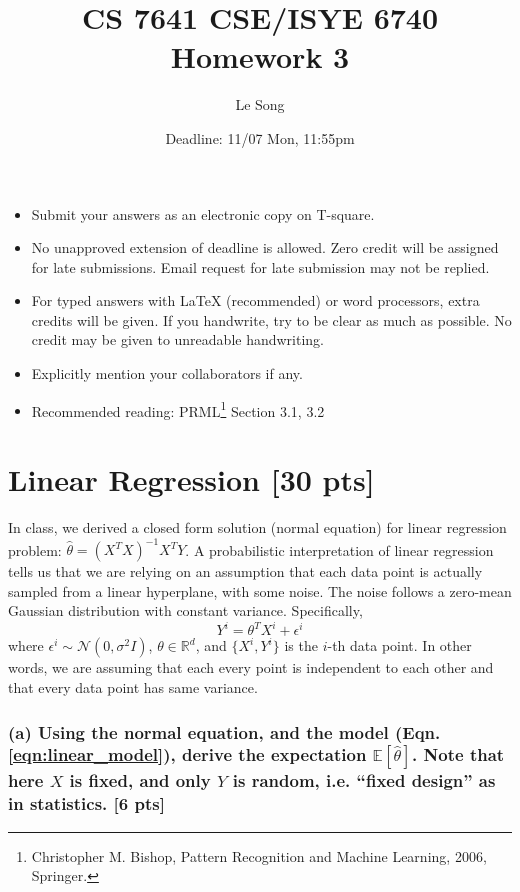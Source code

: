 \documentclass[twoside,10pt]{article}
\begin{document}
\title{CS 7641 CSE/ISYE 6740 Homework 3}
\author{Le Song}
\date{Deadline: 11/07 Mon, 11:55pm}
\maketitle

\begin{itemize}
  \item Submit your answers as an electronic copy on T-square.
  \item No unapproved extension of deadline is allowed. Zero credit will be assigned for late submissions. Email request for late submission may not be replied.
  \item For typed answers with LaTeX (recommended) or word processors, extra credits will be given. If you handwrite, try to be clear as much as possible. No credit may be given to unreadable handwriting.
  \item Explicitly mention your collaborators if any.
  \item Recommended reading: PRML\footnote{Christopher M. Bishop, Pattern Recognition and Machine
Learning, 2006, Springer.} Section 3.1, 3.2
\end{itemize}

\section{Linear Regression [30 pts]}

In class, we derived a closed form solution (normal equation) for
linear regression problem: $\hat{\theta} = (X^T X)^{-1} X^T Y$. A
probabilistic interpretation of linear regression tells us that we
are relying on an assumption that each data point is actually
sampled from a linear hyperplane, with some noise. The noise
follows a zero-mean Gaussian distribution with constant variance.
Specifically,
\begin{equation}
Y^i = \theta^T X^i + \epsilon^i
\label{eqn:linear_model}
\end{equation}
where $\epsilon^i \sim \mathcal{N}(0, \sigma^2 I)$, $\theta \in \mathbb{R}^d$, and $\{X^i, Y^i\}$ is the $i$-th data point. In other words,
we are assuming that each every point is independent to each other
and that every data point has same variance.

\subsubsection*{(a) Using the normal equation, and the model (Eqn. \ref{eqn:linear_model}), derive the expectation
$\mathbb{E}[\hat{\theta}]$. Note that here $X$ is fixed, and only $Y$ is random, i.e. ``fixed design'' as in statistics. [6 pts]}
\end{document}
